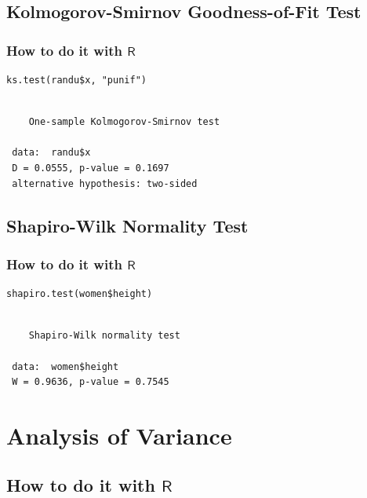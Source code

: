 \documentclass[captions=tableheading]{scrbook}
\begin{document}
\subsection{Kolmogorov-Smirnov Goodness-of-Fit Test}
\label{sec-10-5-1}
\label{sub-Kolmogorov-Smirnov-Goodness-of-Fit-Test}
\subsubsection{How to do it with \(\mathsf{R}\)}
\label{sec-10-5-1-1}



\begin{verbatim}
ks.test(randu$x, "punif")
\end{verbatim}

\begin{verbatim}
 
 	One-sample Kolmogorov-Smirnov test
 
 data:  randu$x 
 D = 0.0555, p-value = 0.1697
 alternative hypothesis: two-sided
\end{verbatim}
\subsection{Shapiro-Wilk Normality Test}
\label{sec-10-5-2}
\label{sub-Shapiro-Wilk-Normality-Test}
\subsubsection{How to do it with \(\mathsf{R}\)}
\label{sec-10-5-2-1}



\begin{verbatim}
shapiro.test(women$height)
\end{verbatim}

\begin{verbatim}
 
 	Shapiro-Wilk normality test
 
 data:  women$height 
 W = 0.9636, p-value = 0.7545
\end{verbatim}
\section{Analysis of Variance}
\label{sec-10-6}
\label{sec-Analysis-of-Variance}
\subsection{How to do it with \(\mathsf{R}\)}
\label{sec-10-6-1}
\end{document}
